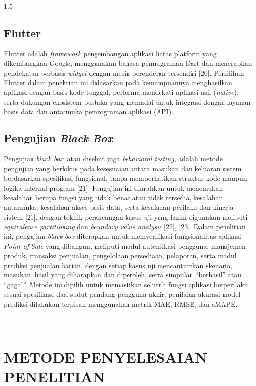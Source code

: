 \documentclass[12pt, a4paper, onecolumn, oneside]{report}
\begin{document}
\begin{spacing}{1.5}
\section{Flutter}

Flutter adalah \textit{framework} pengembangan aplikasi lintas platform yang dikembangkan Google, menggunakan bahasa pemrograman Dart dan menerapkan pendekatan berbasis \textit{widget} dengan mesin perenderan tersendiri [20]. Pemilihan Flutter dalam penelitian ini didasarkan pada kemampuannya menghasilkan aplikasi dengan basis kode tunggal, performa mendekati aplikasi asli (\textit{native}), serta dukungan ekosistem pustaka yang memadai untuk integrasi dengan layanan basis data dan antarmuka pemrograman aplikasi (API).

\section{Pengujian \textit{Black Box}}

Pengujian \textit{black box}, atau disebut juga \textit{behavioral testing}, adalah metode pengujian yang berfokus pada kesesuaian antara masukan dan keluaran sistem berdasarkan spesifikasi fungsional, tanpa memperhatikan struktur kode maupun logika internal program [21]. Pengujian ini diarahkan untuk menemukan kesalahan berupa fungsi yang tidak benar atau tidak tersedia, kesalahan antarmuka, kesalahan akses basis data, serta kesalahan perilaku dan kinerja sistem [21], dengan teknik perancangan kasus uji yang lazim digunakan meliputi \textit{equivalence partitioning} dan \textit{boundary value analysis} [22], [23]. Dalam penelitian ini, pengujian \textit{black box} diterapkan untuk memverifikasi fungsionalitas aplikasi \textit{Point of Sale} yang dibangun, meliputi modul autentikasi pengguna, manajemen produk, transaksi penjualan, pengelolaan persediaan, pelaporan, serta modul prediksi penjualan harian, dengan setiap kasus uji mencantumkan skenario, masukan, hasil yang diharapkan dan diperoleh, serta simpulan ``berhasil'' atau ``gagal''. Metode ini dipilih untuk memastikan seluruh fungsi aplikasi berperilaku sesuai spesifikasi dari sudut pandang pengguna akhir; penilaian akurasi model prediksi dilakukan terpisah menggunakan metrik MAE, RMSE, dan sMAPE.

\chapter[METODE PENYELESAIAN PENELITIAN]{\\ METODE PENYELESAIAN PENELITIAN}


\end{spacing}
\end{document}
